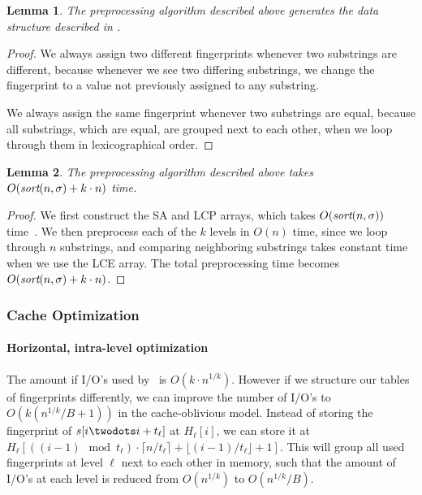 \documentclass[a4]{article}
\newcommand*{\pref}{\prettyref}
\newtheorem{lemma}{Lemma}
\begin{document}
\begin{lemma}
The preprocessing algorithm described above generates the data structure described in \pref{sec:fingerprint-ds}.
\end{lemma}

\begin{proof}
We always assign two different fingerprints whenever two substrings are different, because whenever we see two differing substrings, we change the fingerprint to a value not previously assigned to any substring.

We always assign the same fingerprint whenever two substrings are equal, because all substrings, which are equal, are grouped next to each other, when we loop through them in lexicographical order.
\end{proof}

\begin{lemma}
The preprocessing algorithm described above takes $O(\textit{sort}(n,\sigma) + k\cdot n)$ time.
\end{lemma}

\begin{proof}
We first construct the SA and LCP arrays, which takes $O(\textit{sort}(n,\sigma))$ time~\cite{sort-complexity}. We then preprocess each of the $k$ levels in $O(n)$ time, since we loop through $n$ substrings, and comparing neighboring substrings takes constant time when we use the LCE array. The total preprocessing time becomes $O(\textit{sort}(n,\sigma) + k\cdot n)$.
\end{proof}

\ifreport

\subsubsection{Cache Optimization\label{sec:fingerprint-cache}}

\paragraph{Horizontal, intra-level optimization}

The amount if I/O's used by \fprintk\ is $O(k\cdot n^{1/k})$. However if we structure our tables of fingerprints differently, we can improve the number of I/O's to $O(k(n^{1/k}/B+1))$ in the cache-oblivious model. Instead of storing the fingerprint of $s[i\twodots i+t_\ell]$ at $H_\ell[i]$, we can store it at $H_\ell[((i-1)\mod t_\ell)\cdot\lceil n/t_\ell\rceil+\lfloor (i-1)/t_\ell\rfloor+1]$. This will group all used fingerprints at level $\ell$ next to each other in memory, such that the amount of I/O's at each level is reduced from $O(n^{1/k})$ to $O(n^{1/k}/B)$.
\end{document}
